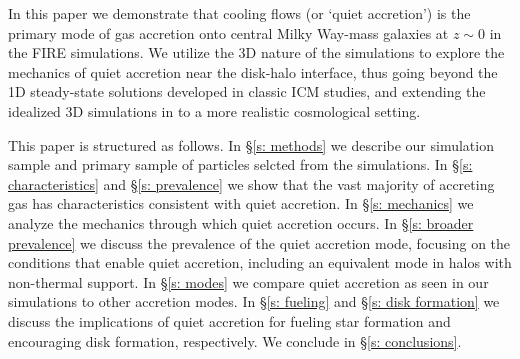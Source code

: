 \documentclass[fleqn,usenatbib]{mnras}
\begin{document}
In this paper we demonstrate that cooling flows (or `quiet accretion') is the primary mode of gas accretion onto central Milky Way-mass galaxies at $z \sim 0$ in the FIRE simulations. 
We utilize the 3D nature of the simulations to explore the mechanics of quiet accretion near the disk-halo interface, thus going beyond the 1D steady-state solutions developed in classic ICM studies, and extending the idealized 3D simulations in \cite{Stern2020} to a more realistic cosmological setting. 

This paper is structured as follows. 
In \S\ref{s: methods} we describe our simulation sample and primary sample of particles selcted from the simulations.
In \S\ref{s: characteristics} and \S\ref{s: prevalence} we show that the vast majority of accreting gas has characteristics consistent with quiet accretion.
In \S\ref{s: mechanics} we analyze the mechanics through which quiet accretion occurs.
In \S\ref{s: broader prevalence} we discuss the prevalence of the quiet accretion mode, focusing on the conditions that enable quiet accretion, including an equivalent mode in halos with non-thermal support.
In \S\ref{s: modes} we compare quiet accretion as seen in our simulations to other accretion modes.
In \S\ref{s: fueling} and \S\ref{s: disk formation} we discuss the implications of quiet accretion for fueling star formation and encouraging disk formation, respectively.
We conclude in \S\ref{s: conclusions}.

\end{document}
